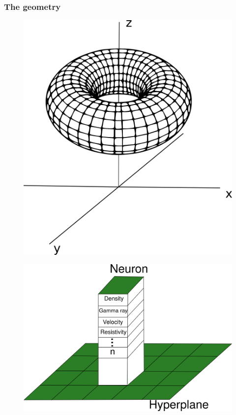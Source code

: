 \documentclass[aspectratio=10]{beamer} %
\begin{document}
\begin{frame}
\frametitle{The geometry}

\begin{figure}[H]
\flushleft
\includegraphics[scale=0.2]{Imagens/toro.png}
\label{toro}
\end{figure}
\begin{figure}
\flushright
\includegraphics[scale=0.33]{Imagens/hiperplano.png}
\label{hiperplano}
\end{figure}
\end{frame}
\end{document}
